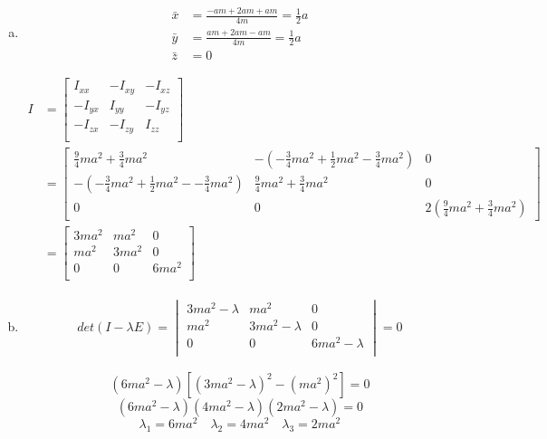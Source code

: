 \documentclass{article}
\begin{document}
\begin{enumerate}[(a)]

\item
\begin{align*}
\bar{x}&=\frac{-am+2am+am}{4m}=\frac{1}{2}a\\
\bar{y}&=\frac{am+2am-am}{4m}=\frac{1}{2}a\\
\bar{z}&=0
\end{align*}

\begin{align*}
I&=
\begin{bmatrix}
	 I_{xx} & -I_{xy} & -I_{xz}\\
	-I_{yx} &  I_{yy} & -I_{yz}\\
	-I_{zx} & -I_{zy} &  I_{zz}\\
\end{bmatrix}\\
&=
\begin{bmatrix}
	\frac{9}{4}ma^2+\frac{3}{4}ma^2&-(-\frac{3}{4}ma^2+\frac{1}{2}ma^2-\frac{3}{4}ma^2)&0\\
	-(-\frac{3}{4}ma^2+\frac{1}{2}ma^2--\frac{3}{4}ma^2)&\frac{9}{4}ma^2+\frac{3}{4}ma^2&0\\
	0&0&2\left(\frac{9}{4}ma^2+\frac{3}{4}ma^2\right)
\end{bmatrix}\\
&=
\begin{bmatrix}
	3ma^2&ma^2&0\\
	ma^2&3ma^2&0\\
	0&0&6ma^2\\
\end{bmatrix}
\end{align*}

\item
\begin{gather*}
det(I-\lambda E)=
\begin{vmatrix}
	3ma^2-\lambda&ma^2&0\\
	ma^2&3ma^2-\lambda&0\\
	0&0&6ma^2-\lambda\\
\end{vmatrix}
=0
\end{gather*}

$$(6ma^2-\lambda)[(3ma^2-\lambda)^2-(ma^2)^2]=0$$
$$(6ma^2-\lambda)(4ma^2-\lambda)(2ma^2-\lambda)=0$$
$$\lambda_1=6ma^2\quad\lambda_2=4ma^2\quad\lambda_3=2ma^2$$



\end{enumerate}
\end{document}
